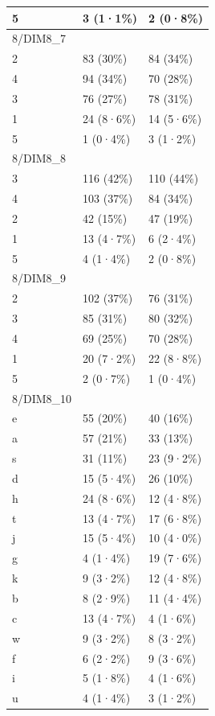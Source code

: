 \documentclass[
]{book}
\begin{document}
\begin{tabular}{l|l|l}
\hline
5 & 3 (1·1\%) & 2 (0·8\%)\\
\hline
8/DIM8\_7 &  & \\
\hline
2 & 83 (30\%) & 84 (34\%)\\
\hline
4 & 94 (34\%) & 70 (28\%)\\
\hline
3 & 76 (27\%) & 78 (31\%)\\
\hline
1 & 24 (8·6\%) & 14 (5·6\%)\\
\hline
5 & 1 (0·4\%) & 3 (1·2\%)\\
\hline
8/DIM8\_8 &  & \\
\hline
3 & 116 (42\%) & 110 (44\%)\\
\hline
4 & 103 (37\%) & 84 (34\%)\\
\hline
2 & 42 (15\%) & 47 (19\%)\\
\hline
1 & 13 (4·7\%) & 6 (2·4\%)\\
\hline
5 & 4 (1·4\%) & 2 (0·8\%)\\
\hline
8/DIM8\_9 &  & \\
\hline
2 & 102 (37\%) & 76 (31\%)\\
\hline
3 & 85 (31\%) & 80 (32\%)\\
\hline
4 & 69 (25\%) & 70 (28\%)\\
\hline
1 & 20 (7·2\%) & 22 (8·8\%)\\
\hline
5 & 2 (0·7\%) & 1 (0·4\%)\\
\hline
8/DIM8\_10 &  & \\
\hline
e & 55 (20\%) & 40 (16\%)\\
\hline
a & 57 (21\%) & 33 (13\%)\\
\hline
s & 31 (11\%) & 23 (9·2\%)\\
\hline
d & 15 (5·4\%) & 26 (10\%)\\
\hline
h & 24 (8·6\%) & 12 (4·8\%)\\
\hline
t & 13 (4·7\%) & 17 (6·8\%)\\
\hline
j & 15 (5·4\%) & 10 (4·0\%)\\
\hline
g & 4 (1·4\%) & 19 (7·6\%)\\
\hline
k & 9 (3·2\%) & 12 (4·8\%)\\
\hline
b & 8 (2·9\%) & 11 (4·4\%)\\
\hline
c & 13 (4·7\%) & 4 (1·6\%)\\
\hline
w & 9 (3·2\%) & 8 (3·2\%)\\
\hline
f & 6 (2·2\%) & 9 (3·6\%)\\
\hline
i & 5 (1·8\%) & 4 (1·6\%)\\
\hline
u & 4 (1·4\%) & 3 (1·2\%)\\

\end{tabular}
\end{document}
